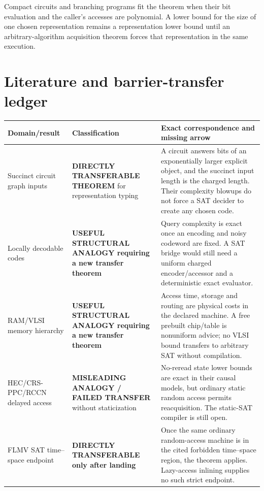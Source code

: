 \documentclass[11pt]{article}
\begin{document}
Compact circuits and branching programs fit the theorem when their bit
evaluation and the caller's accesses are polynomial.  A lower bound for the
size of one chosen representation remains a representation lower bound until
an arbitrary-algorithm acquisition theorem forces that representation in the
same execution.

\section{Literature and barrier-transfer ledger}
\begin{center}
\begin{tabular}{p{.24\linewidth}p{.22\linewidth}p{.46\linewidth}}
\toprule
Domain/result & Classification & Exact correspondence and missing arrow\\
\midrule
Succinct circuit graph inputs \cite{GW83,PY86} & \textbf{DIRECTLY TRANSFERABLE THEOREM} for representation typing & A circuit answers bits of an exponentially larger explicit object, and the succinct input length is the charged length.  Their complexity blowups do not force a SAT decider to create any chosen code.\\
Locally decodable codes \cite{Yekhanin11} & \textbf{USEFUL STRUCTURAL ANALOGY requiring a new transfer theorem} & Query complexity is exact once an encoding and noisy codeword are fixed.  A SAT bridge would still need a uniform charged encoder/accessor and a deterministic exact evaluator.\\
RAM/VLSI memory hierarchy & \textbf{USEFUL STRUCTURAL ANALOGY requiring a new transfer theorem} & Access time, storage and routing are physical costs in the declared machine.  A free prebuilt chip/table is nonuniform advice; no VLSI bound transfers to arbitrary SAT without compilation.\\
HEC/CRS-PPC/RCCN delayed access & \textbf{MISLEADING ANALOGY / FAILED TRANSFER} without staticization & No-reread state lower bounds are exact in their causal models, but ordinary static random access permits reacquisition.  The static-SAT compiler is still open.\\
FLMV SAT time--space endpoint & \textbf{DIRECTLY TRANSFERABLE only after landing} & Once the same ordinary random-access machine is in the cited forbidden time--space region, the theorem applies.  Lazy-access inlining supplies no such strict endpoint.\\
\bottomrule
\end{tabular}
\end{center}
\end{document}
